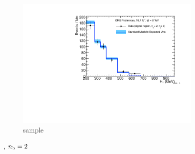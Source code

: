\begin{figure}[h!]
\begin{subfigure}[b]{0.48\textwidth}
    \includegraphics[width=\textwidth,page=4]
    {Figs/results/v0/blueBand/bestFit_2012dev_RQcdZero_fZinvAll_2b_le3j-1h_smOnly}
    \caption{\mj sample}
  \end{subfigure}
  \caption{\njlow, $n_{\text{b}} = 2$}
  \label{fig:blue_fits_2b_le3j}
\end{figure}

